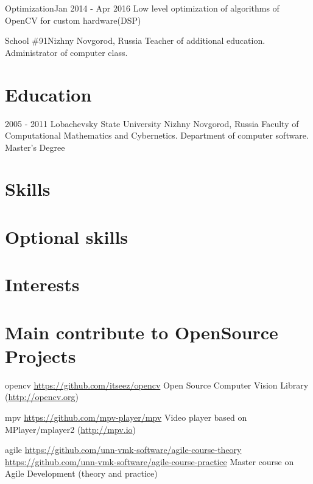 \documentclass[12pt,a4paper]{moderncv}
\begin{document}
\cventry{}
	{Optimization}{Jan 2014 - Apr 2016}{}{}
	{Low level optimization of algorithms of OpenCV for custom hardware(DSP)}

	{School \#91}{Nizhny Novgorod, Russia}{}{}
	{Teacher of additional education. Administrator of computer class.}

\section{Education}
  \cventry
    {2005 - 2011}
    {Lobachevsky State University}
    {Nizhny Novgorod, Russia}
    {}{}
    {Faculty of Computational Mathematics and Cybernetics. Department of computer software.\newline{}
    Master's Degree}


\section{Skills}

\section{Optional skills}

\section{Interests}


\section{Main contribute to OpenSource Projects}
\cvline
  {opencv}
  {\url{https://github.com/itseez/opencv}\newline{}
  Open Source Computer Vision Library (\url{http://opencv.org})}

\cvline
  {mpv}
  {\url{https://github.com/mpv-player/mpv}\newline{}
  Video player based on MPlayer/mplayer2 (\url{http://mpv.io})}

\cvline
  {agile}
  {
  \url{https://github.com/unn-vmk-software/agile-course-theory}\newline{}
  \url{https://github.com/unn-vmk-software/agile-course-practice}\newline{}
  Master course on Agile Development (theory and practice)
  }
\end{document}
